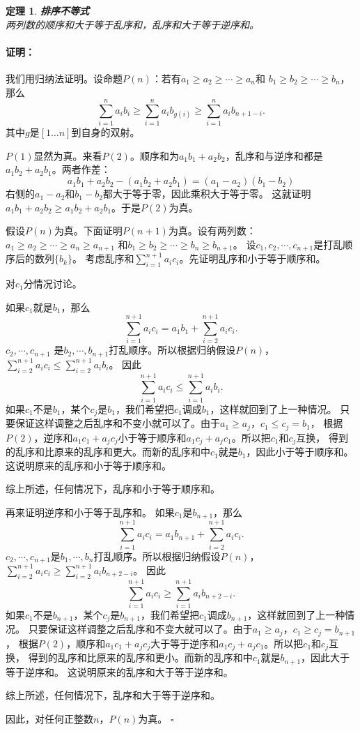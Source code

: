 \documentclass[12pt,UTF8]{ctexbook}
\newtheorem{tm}{定理}[section]
\newenvironment{proof2}{\paragraph{\textbf{证明：}}}{\hfill$\square$}
\begin{document}
\begin{tm}\textbf{排序不等式}\\
    两列数的顺序和大于等于乱序和，乱序和大于等于逆序和。
\end{tm}
\begin{proof2}
    我们用归纳法证明。设命题$P(n)$：若有$a_1 \geqslant a_2 \geqslant \cdots \geqslant a_n$和
    $b_1 \geqslant b_2 \geqslant \cdots \geqslant b_n$，那么
    $$ \sum_{i=1}^n a_ib_i \geqslant \sum_{i=1}^n a_ib_{g(i)} \geqslant \sum_{i=1}^n a_ib_{n+1-i} . $$
    其中$g$是$[1\dots n]$到自身的双射。

    $P(1)$显然为真。来看$P(2)$。顺序和为$a_1b_1 + a_2b_2$，乱序和与逆序和都是$a_1b_2 + a_2b_1$。两者作差：
    $$ a_1b_1 + a_2b_2 - (a_1b_2 + a_2b_1) = (a_1 - a_2)(b_1 - b_2) $$
    右侧的$a_1-a_2$和$b_1-b_2$都大于等于零，因此乘积大于等于零。
    这就证明$a_1b_1 + a_2b_2 \geqslant a_1b_2 + a_2b_1$。于是$P(2)$为真。

    假设$P(n)$为真。下面证明$P(n+1)$为真。设有两列数：
    $a_1 \geqslant a_2 \geqslant \cdots \geqslant a_n\geqslant a_{n+1}$
    和$b_1 \geqslant b_2 \geqslant \cdots \geqslant b_n \geqslant b_{n+1}$。
    设$c_1, c_2, \cdots , c_{n+1}$是打乱顺序后的数列$\{b_k\}$。
    考虑乱序和$\sum_{i=1}^{n+1} a_i c_i$。先证明乱序和小于等于顺序和。

    对$c_{1}$分情况讨论。

    如果$c_1$就是$b_1$，那么
    $$\sum_{i=1}^{n+1} a_i c_i = a_1b_1 + \sum_{i=2}^{n+1} a_i c_i.$$
    $c_2, \cdots, c_{n+1}$
    是$b_2, \cdots, b_{n+1}$打乱顺序。所以根据归纳假设$P(n)$，
    $\sum_{i=2}^{n+1} a_i c_i \leqslant \sum_{i=2}^{n+1} a_i b_i$。
    因此
    $$\sum_{i=1}^{n+1} a_i c_i \leqslant \sum_{i=1}^{n+1} a_i b_i.$$
    如果$c_1$不是$b_1$，某个$c_j$是$b_1$，我们希望把$c_1$调成$b_1$，这样就回到了上一种情况。
    只要保证这样调整之后乱序和不变小就可以了。由于$a_1 \geqslant a_j$，$c_1 \leqslant c_j = b_1$，
    根据$P(2)$，逆序和$a_1c_1 + a_jc_j$小于等于顺序和$a_1c_j + a_jc_1$。所以把$c_1$和$c_j$互换，
    得到的乱序和比原来的乱序和更大。而新的乱序和中$c_1$就是$b_1$，因此小于等于顺序和。
    这说明原来的乱序和小于等于顺序和。

    综上所述，任何情况下，乱序和小于等于顺序和。

    再来证明逆序和小于等于乱序和。
    如果$c_1$是$b_{n+1}$，那么
    $$\sum_{i=1}^{n+1} a_i c_i = a_1b_{n+1} + \sum_{i=2}^{n+1} a_i c_i.$$
    $c_2, \cdots, c_{n+1}$是$b_1, \cdots, b_{n}$打乱顺序。所以根据归纳假设$P(n)$，
    $\sum_{i=2}^{n+1} a_i c_i \geqslant \sum_{i=2}^{n+1} a_i b_{n+2-i}$。
    因此
    $$\sum_{i=1}^{n+1} a_i c_i \geqslant \sum_{i=1}^{n+1} a_i b_{n+2-i}.$$
    如果$c_1$不是$b_{n+1}$，某个$c_j$是$b_{n+1}$，我们希望把$c_1$调成$b_{n+1}$，这样就回到了上一种情况。
    只要保证这样调整之后乱序和不变大就可以了。由于$a_1 \geqslant a_j$，$c_1 \geqslant c_j = b_{n+1}$，
    根据$P(2)$，顺序和$a_1c_1 + a_jc_j$大于等于逆序和$a_1c_j + a_jc_1$。所以把$c_1$和$c_j$互换，
    得到的乱序和比原来的乱序和更小。而新的乱序和中$c_1$就是$b_{n+1}$，因此大于等于逆序和。
    这说明原来的乱序和大于等于逆序和。

    综上所述，任何情况下，乱序和大于等于逆序和。
    
    因此，对任何正整数$n$，$P(n)$为真。
\end{proof2}
\end{document}

